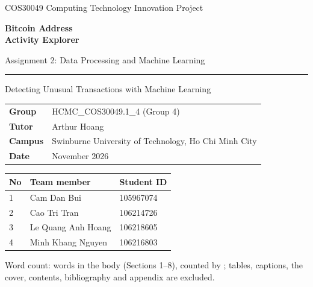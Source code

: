 \begin{titlepage}
\raggedright
\vspace*{1.2cm}
{\large\color{muted} COS30049 Computing Technology Innovation Project\par}
\vspace{0.5cm}
{\fontsize{32}{38}\selectfont\bfseries Bitcoin Address\\[2pt] Activity Explorer\par}
\vspace{0.5cm}
{\Large Assignment 2: Data Processing and Machine Learning\par}
\vspace{0.35cm}
{\color{accent}\rule{\textwidth}{2.5pt}\par}
\vspace{0.35cm}
{\large\color{muted} Detecting Unusual Transactions with Machine Learning\par}
\vspace{1.9cm}

\begin{tabular}{@{}ll@{}}
\textbf{Group} & HCMC\_COS30049.1\_4 (Group 4) \\
\textbf{Tutor} & Arthur Hoang \\
\textbf{Campus} & Swinburne University of Technology, Ho Chi Minh City \\
\textbf{Date} & November 2026 \\
\end{tabular}

\vspace{1.1cm}
{\renewcommand{\arraystretch}{1.5}
\begin{tabular}{|p{1cm}|p{7.2cm}|p{3.6cm}|}
\hline
\rowcolor{headfill}\textbf{No} & \textbf{Team member} & \textbf{Student ID} \\ \hline
1 & Cam Dan Bui & 105967074 \\ \hline
2 & Cao Tri Tran & 106214726 \\ \hline
3 & Le Quang Anh Hoang & 106218605 \\ \hline
4 & Minh Khang Nguyen & 106216803 \\ \hline
\end{tabular}}

\vfill
{\small\color{muted} Word count: words in the body (Sections 1--8), counted by
; tables, captions, the cover, contents, bibliography and appendix are excluded.\par}
\end{titlepage}
